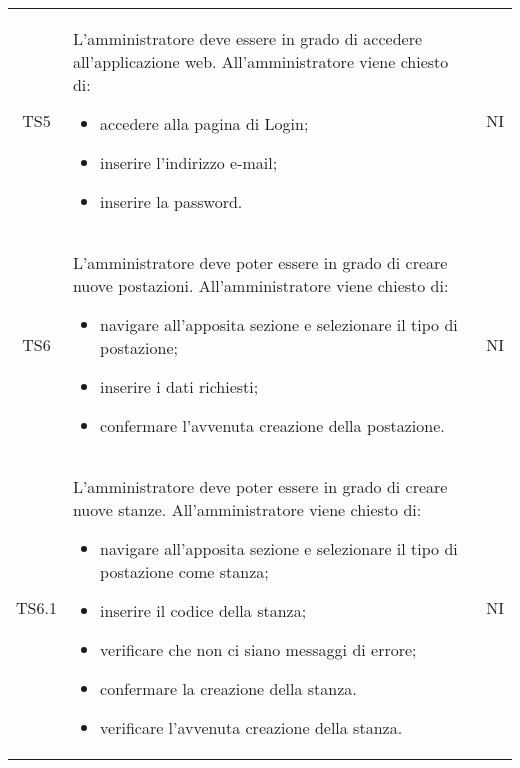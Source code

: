 {\begin{longtable}{ c C{11cm} c }
        TS5&
        \begin{flushleft}
            L'amministratore deve essere in grado di accedere all'applicazione web.
            All'amministratore viene chiesto di:
        \end{flushleft}
        \begin{itemize}
            \item accedere alla pagina di Login;
            \item inserire l'indirizzo e-mail;
            \item inserire la password.
        \end{itemize}&
        NI\\

        TS6&
        \begin{flushleft}
            L'amministratore deve poter essere in grado di creare nuove postazioni.
            All'amministratore viene chiesto di:
        \end{flushleft}
        \begin{itemize}
            \item navigare all'apposita sezione e selezionare il tipo di postazione;
            \item inserire i dati richiesti;
            \item confermare l'avvenuta creazione della postazione.
        \end{itemize}&
        NI\\

        TS6.1&
        \begin{flushleft}
            L'amministratore deve poter essere in grado di creare nuove stanze.
            All'amministratore viene chiesto di:
        \end{flushleft}
        \begin{itemize}
            \item navigare all'apposita sezione e selezionare il tipo di postazione come stanza;
            \item inserire il codice della stanza;
            \item verificare che non ci siano messaggi di errore;
            \item confermare la creazione della stanza.
            \item verificare l'avvenuta creazione della stanza.
        \end{itemize}&
        NI\\


\end{longtable}}
